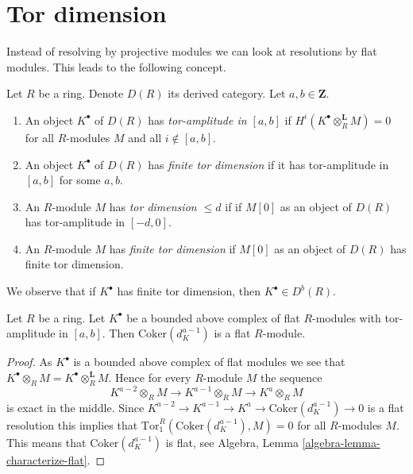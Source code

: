 \section{Tor dimension}
\label{section-tor}

\noindent
Instead of resolving by projective modules we can look
at resolutions by flat modules. This leads to the following
concept.

\begin{definition}
\label{definition-tor-amplitude}
Let $R$ be a ring. Denote $D(R)$ its derived category.
Let $a, b \in \mathbf{Z}$.
\begin{enumerate}
\item An object $K^\bullet$ of $D(R)$ has
{\it tor-amplitude in $[a, b]$}
if $H^i(K^\bullet \otimes_R^\mathbf{L} M) = 0$ for all $R$-modules
$M$ and all $i \not \in [a, b]$.
\item An object $K^\bullet$ of $D(R)$ has {\it finite tor dimension}
if it has tor-amplitude in $[a, b]$ for some $a, b$.
\item An $R$-module $M$ has {\it tor dimension $\leq d$} if
if $M[0]$ as an object of $D(R)$ has tor-amplitude in $[-d, 0]$.
\item An $R$-module $M$ has {\it finite tor dimension}
if $M[0]$ as an object of $D(R)$ has finite tor dimension.
\end{enumerate}
\end{definition}

\noindent
We observe that if $K^\bullet$ has finite tor dimension,
then $K^\bullet \in D^b(R)$.

\begin{lemma}
\label{lemma-last-one-flat}
Let $R$ be a ring. Let $K^\bullet$ be a bounded above complex of
flat $R$-modules with tor-amplitude in $[a, b]$.
Then $\text{Coker}(d_K^{a - 1})$ is a flat $R$-module.
\end{lemma}

\begin{proof}
As $K^\bullet$ is a bounded above complex of flat modules we see
that $K^\bullet \otimes_R M = K^\bullet \otimes_R^{\mathbf{L}} M$.
Hence for every $R$-module $M$ the sequence
$$
K^{a - 2} \otimes_R M \to K^{a - 1} \otimes_R M \to K^a \otimes_R M
$$
is exact in the middle. Since
$K^{a - 2} \to K^{a - 1} \to K^a \to \text{Coker}(d_K^{a - 1}) \to 0$
is a flat resolution this implies that
$\text{Tor}_1^R(\text{Coker}(d_K^{a - 1}), M) = 0$
for all $R$-modules $M$. This means that
$\text{Coker}(d_K^{a - 1})$ is flat, see
Algebra, Lemma \ref{algebra-lemma-characterize-flat}.
\end{proof}

